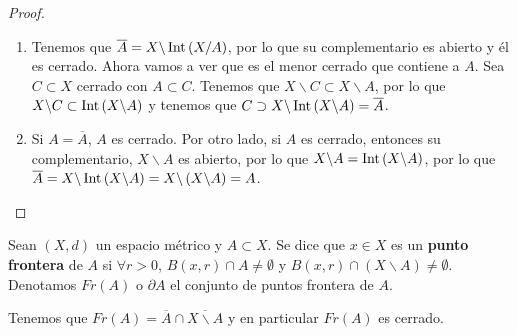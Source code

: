 \begin{proof}
\begin{enumerate}
\item Tenemos que $\displaystyle \overline{A} = X\backslash\operatorname{Int}\left(X/A\right) $, por lo que su complementario es abierto y él es cerrado. Ahora vamos a ver que es el menor cerrado que contiene a $\displaystyle A $. Sea $\displaystyle C \subset X $ cerrado con $\displaystyle A \subset C $. Tenemos que $\displaystyle X\backslash C \subset X\backslash A $, por lo que $\displaystyle X\backslash C \subset \operatorname{Int}\left(X\backslash A\right) $ y tenemos que $\displaystyle C \supset X\backslash\operatorname{Int}\left(X\backslash A\right) = \overline{A} $.
\item Si $\displaystyle A = \overline{A} $, $\displaystyle A  $ es cerrado.
Por otro lado, si $\displaystyle A $ es cerrado, entonces su complementario, $\displaystyle X\backslash A $ es abierto, por lo que $\displaystyle X\backslash A = \operatorname{Int}\left(X\backslash A\right) $, por lo que $\displaystyle \overline{A} = X\backslash\operatorname{Int}\left(X\backslash A\right) = X\backslash \left(X\backslash A\right) = A $.
\end{enumerate}
\end{proof}
\begin{definition}
Sean $\displaystyle \left(X,d\right) $ un espacio métrico y $\displaystyle A \subset X $. Se dice que $\displaystyle x \in X $ es un \textbf{punto frontera} de $\displaystyle A $ si $\displaystyle \forall r > 0 $, $\displaystyle B\left(x,r\right) \cap A \neq \emptyset $ y $\displaystyle B\left(x,r\right) \cap \left(X\backslash A\right) \neq \emptyset $. Denotamos $\displaystyle Fr\left(A\right) $ o $\displaystyle \partial A$ el conjunto de puntos frontera de $\displaystyle A $.
\end{definition}
\begin{observation}
Tenemos que $\displaystyle Fr\left(A\right) = \overline{A} \cap \overline{X\backslash A} $ y en particular $\displaystyle Fr\left(A\right) $ es cerrado.
\end{observation}
